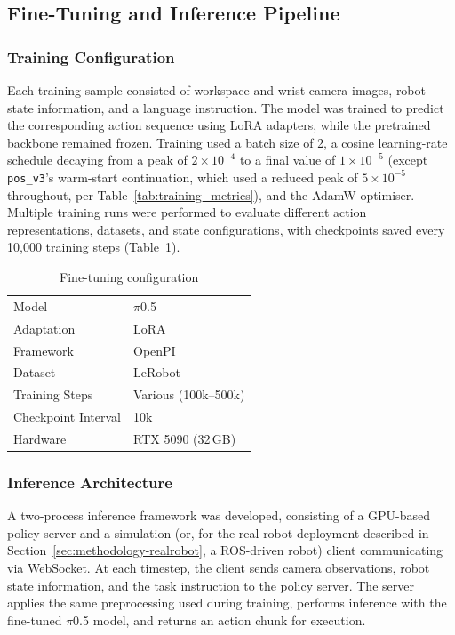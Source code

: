 \documentclass[12pt]{article}
\begin{document}
\subsection{Fine-Tuning and Inference Pipeline}

\subsubsection{Training Configuration}
Each training sample consisted of workspace and wrist camera images, robot state information, and a language instruction. The model was trained to predict the corresponding action sequence using LoRA adapters, while the pretrained backbone remained frozen. Training used a batch size of 2, a cosine learning-rate schedule decaying from a peak of $2\times10^{-4}$ to a final value of $1\times10^{-5}$ (except \texttt{pos\_v3}'s warm-start continuation, which used a reduced peak of $5\times10^{-5}$ throughout, per Table~\ref{tab:training_metrics}), and the AdamW optimiser. Multiple training runs were performed to evaluate different action representations, datasets, and state configurations, with checkpoints saved every 10,000 training steps (Table~\ref{tab:finetuning_config}).

\begin{table}[H]
\centering
\caption{Fine-tuning configuration}
\label{tab:finetuning_config}
\begin{tabular}{ll}
\toprule
Model & $\pi$0.5 \\
Adaptation & LoRA \\
Framework & OpenPI \\
Dataset & LeRobot \\
Training Steps & Various (100k--500k) \\
Checkpoint Interval & 10k \\
Hardware & RTX 5090 (32\,GB) \\
\bottomrule
\end{tabular}
\end{table}

\subsubsection{Inference Architecture}
A two-process inference framework was developed, consisting of a GPU-based policy server and a simulation (or, for the real-robot deployment described in Section~\ref{sec:methodology-realrobot}, a ROS-driven robot) client communicating via WebSocket. At each timestep, the client sends camera observations, robot state information, and the task instruction to the policy server. The server applies the same preprocessing used during training, performs inference with the fine-tuned $\pi$0.5 model, and returns an action chunk for execution.
\end{document}
